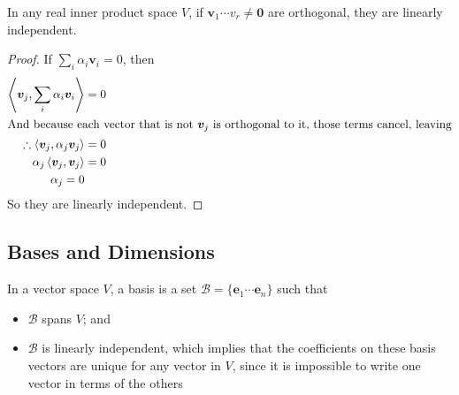 \documentclass{article}
\begin{document}
	\begin{lemma}
		In any real inner product space $V$, if $\bm v_1 \cdots v_r \neq \bm 0$ are orthogonal, they are linearly independent.
	\end{lemma}
	\begin{proof}
		If $\sum_i \alpha_i \bm v_i = 0$, then
		\begin{align*}
			\left\langle \bm v_j, \sum_i \alpha_i \bm v_i \right\rangle &= 0 \\
			\intertext{And because each vector that is not $\bm v_j$ is orthogonal to it, those terms cancel, leaving}
			\therefore \left\langle \bm v_j, \alpha_j \bm v_j \right\rangle &= 0 \\
			\alpha_j \left\langle \bm v_j, \bm v_j \right\rangle &= 0 \\
			\alpha_j = 0
		\end{align*}
		So they are linearly independent.
	\end{proof}

	\subsection{Bases and Dimensions}
	In a vector space $V$, a basis is a set $\mathcal B = \{ \bm e_1 \cdots \bm e_n \}$ such that
	\begin{itemize}
		\item $\mathcal B$ spans $V$; and
		\item $\mathcal B$ is linearly independent, which implies that the coefficients on these basis vectors are unique for any vector in $V$, since it is impossible to write one vector in terms of the others
	\end{itemize}
\end{document}
